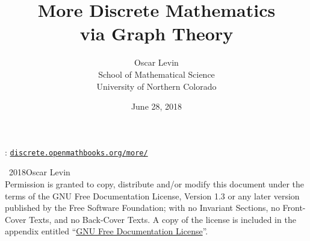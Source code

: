 \documentclass[10pt,]{book}
\title{More Discrete Mathematics\\
{\large via Graph Theory}}
\author{Oscar Levin\\
School of Mathematical Science\\
University of Northern Colorado
}
\date{June 28, 2018}
\newcommand{\mono}[1]{\texttt{#1}}
\theoremstyle{plain}
\theoremstyle{definition}
\theoremstyle{definition}
\theoremstyle{definition}
\numberwithin{equation}{chapter}
\begin{document}
\frontmatter

\thispagestyle{empty}
\hypertarget{colophon-1}{}
: \href{http://discrete.openmathbooks.org/more/}{\mono{discrete.openmathbooks.org/more/}}\par\medskip
\noindent\textcopyright\ 2018\quad{}Oscar Levin\\[0.5\baselineskip]
Permission is granted to copy, distribute and/or modify this document under the terms of the GNU Free Documentation License, Version 1.3 or any later version published by the Free Software Foundation; with no Invariant Sections, no Front-Cover Texts, and no Back-Cover Texts.  A copy of the license is included in the appendix entitled ``\hyperref[appendix-gfdl]{GNU Free Documentation License}''.\par\medskip
{}
\null\clearpage
\end{document}
